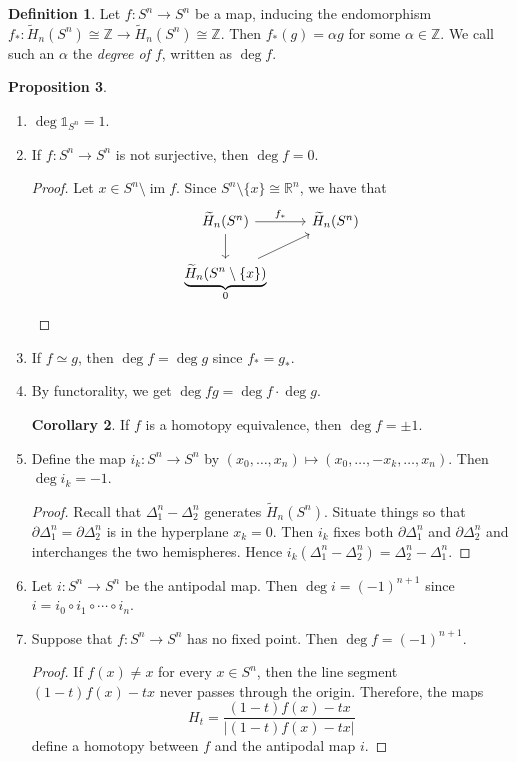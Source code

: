 \documentclass[10pt,letterpaper,cm]{nupset}
\theoremstyle{definition}
\newtheorem{definition}{Definition}[subsection]
\theoremstyle{theorem}
\newtheorem{prop}[definition]{Proposition}
\newtheorem{corollary}[definition]{Corollary}
\theoremstyle{remark}
\newcommand{\R}{\mathbb{R}}
\newcommand{\Z}{\mathbb Z}
\newcommand{\1}{\mathbb{1}}
\newcommand{\0}{\vec 0}
\DeclareMathOperator{\im}{im}
\begin{document}
\begin{definition}
Let $f: S^n \to S^n$ be a map, inducing the endomorphism $f_{\ast} : \widetilde{H}_n(S^n) \cong \Z \to \widetilde{H}_n(S^n) \cong \Z$. Then $f_{\ast}(g) = \alpha g$ for some $\alpha \in \Z$. We call such an $\alpha$ the \textit{degree of $f$}, written as $\deg{f}$.
\end{definition}

\begin{prop} $ $
\begin{enumerate}
\item $\deg{\1_{S^n}}=1$.
\item If $f: S^n \to S^n$ is not surjective, then $\deg{f} = 0$.
\begin{proof}
Let $x\in S^n \setminus \im{f}$. Since $S^n \setminus \{x\} \cong \R^n$, we have that 
\[
\begin{tikzcd}
\widetilde{H}_n(S^n) \arrow[r, "f_{\ast}"] \arrow[d] & \widetilde{H}_n(S^n) \\
\underbrace{\widetilde{H}_n(S^n \setminus \{x\})}_{0} \arrow[ru]      &                     
\end{tikzcd}
\]
\end{proof}
\item If $f \simeq g$, then $\deg{f} = \deg{g}$ since $f_{\ast} = g_{\ast}$.
\item By functorality, we get $\deg{fg}= \deg{f}\cdot \deg{g}$.
\begin{corollary}
If $f$ is a homotopy equivalence, then $\deg{f}= \pm 1$.
\end{corollary}
\item Define the map $i_k : S^n \to S^n$ by $(x_0, \ldots, x_n) \mapsto (x_0, \ldots, -x_k, \ldots, x_n)$. Then $\deg{i_k} = {-}1$.
\begin{proof}
Recall that $\Delta_1^n -\Delta_2^n$ generates $\widetilde{H}_n(S^n)$. Situate things so that $\partial{\Delta_1^n} = \partial{\Delta_2^n}$ is in the hyperplane $x_k=0$. Then $i_k$ fixes both $\partial{\Delta_1^n}$ and $\partial{\Delta_2^n}$ and interchanges the two hemispheres. Hence $i_k(\Delta_1^n -\Delta_2^n)= \Delta_2^n- \Delta_1^n $.
\end{proof}
\item Let $i: S^n \to S^n$ be the antipodal map. Then $\deg{i} = ({-1})^{n+1}$ since $i= i_0 \circ i_1 \circ \cdots \circ i_n$.
\item Suppose that $f: S^n \to S^n$ has no fixed point. Then $\deg{f}= ({-}1)^{n+1}$.
\begin{proof}
If $f(x) \ne x$ for every $x\in S^n$, then the line segment $(1-t)f(x) - tx$ never passes through the origin. Therefore, the maps $$H_t = \frac{ (1-t)f(x)-tx  }{|(1-t)f(x) -tx|     }$$ define a homotopy between $f$ and the antipodal map $i$.
\end{proof}
\end{enumerate}
\end{prop}
\end{document}
